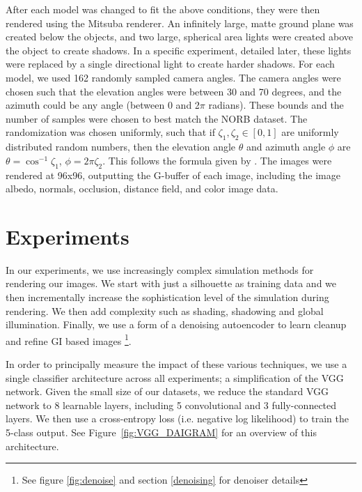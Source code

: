 \documentclass[10pt,twocolumn,letterpaper]{article}
\begin{document}
After each model was changed to fit the above conditions, they were then rendered using the Mitsuba renderer. An infinitely large, matte ground plane was created below the objects, and two large, spherical area lights were created above the object to create shadows. In a specific experiment, detailed later, these lights were replaced by a single directional light to create harder shadows. For each model, we used 162 randomly sampled camera angles. The camera angles were chosen such that the elevation angles were between 30 and 70 degrees, and the azimuth could be any angle (between 0 and 2$\pi$ radians). These bounds and the number of samples were chosen to best match the NORB dataset. The randomization was chosen uniformly, such that if $\zeta_1,\zeta_2\in[0,1]$ are uniformly distributed random numbers, then the elevation angle $\theta$ and azimuth angle $\phi$ are $\theta = \cos^{-1}\zeta_1$, $\phi = 2\pi \zeta_2$. This follows the formula given by \cite{Pharr:2010:PBR:1854996}. The images were rendered at 96x96, outputting the G-buffer of each image, including the image albedo, normals, occlusion, distance field, and color image data.

\section{Experiments}

In our experiments, we use increasingly complex simulation methods for rendering our images.  We start with just a silhouette as training data and we then incrementally increase the sophistication level of the simulation during rendering.  We then add complexity such as shading, shadowing and global illumination. Finally, we use a form of a denoising autoencoder to learn cleanup and refine GI based images \footnote{See figure \ref{fig:denoise} and section \ref{denoising} for denoiser details}.

In order to principally measure the impact of these various techniques, we use a single classifier architecture across all experiments; a simplification of the VGG network\cite{DBLP:journals/corr/SimonyanZ14a}. Given the small size of our datasets, we reduce the standard VGG network to 8 learnable layers, including 5 convolutional and 3 fully-connected layers. We then use a cross-entropy loss (i.e. negative log likelihood) to train the 5-class output. See 
Figure~\ref{fig:VGG_DAIGRAM} for an overview of this architecture.
\end{document}
